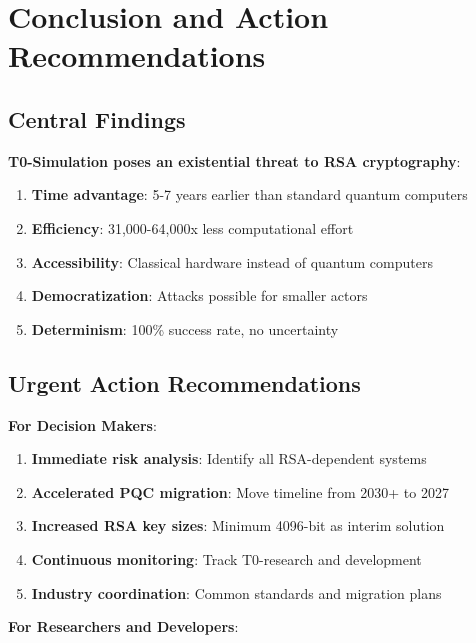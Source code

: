 \documentclass[12pt,a4paper]{article}
\begin{document}
	\section{Conclusion and Action Recommendations}
	
	\subsection{Central Findings}
	
	\begin{tcolorbox}[colback=red!5!white,colframe=red!75!black,title=Critical Conclusions]
		\textbf{T0-Simulation poses an existential threat to RSA cryptography}:
		
		\begin{enumerate}
			\item \textbf{Time advantage}: 5-7 years earlier than standard quantum computers
			\item \textbf{Efficiency}: 31,000-64,000x less computational effort
			\item \textbf{Accessibility}: Classical hardware instead of quantum computers
			\item \textbf{Democratization}: Attacks possible for smaller actors
			\item \textbf{Determinism}: 100\% success rate, no uncertainty
		\end{enumerate}
	\end{tcolorbox}
	
	\subsection{Urgent Action Recommendations}
	
	\textbf{For Decision Makers}:
	
	\begin{enumerate}
		\item \textbf{Immediate risk analysis}: Identify all RSA-dependent systems
		\item \textbf{Accelerated PQC migration}: Move timeline from 2030+ to 2027
		\item \textbf{Increased RSA key sizes}: Minimum 4096-bit as interim solution
		\item \textbf{Continuous monitoring}: Track T0-research and development
		\item \textbf{Industry coordination}: Common standards and migration plans
	\end{enumerate}
	
	\textbf{For Researchers and Developers}:
	
\end{document}
